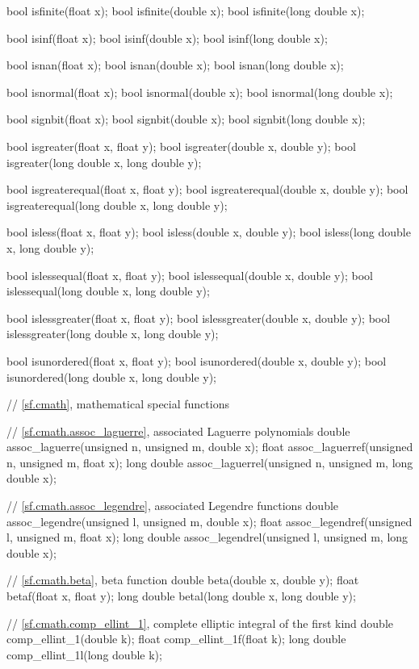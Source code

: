 \begin{codeblock}
{  bool isfinite(float x);
  bool isfinite(double x);
  bool isfinite(long double x);

  bool isinf(float x);
  bool isinf(double x);
  bool isinf(long double x);

  bool isnan(float x);
  bool isnan(double x);
  bool isnan(long double x);

  bool isnormal(float x);
  bool isnormal(double x);
  bool isnormal(long double x);

  bool signbit(float x);
  bool signbit(double x);
  bool signbit(long double x);

  bool isgreater(float x, float y);
  bool isgreater(double x, double y);
  bool isgreater(long double x, long double y);

  bool isgreaterequal(float x, float y);
  bool isgreaterequal(double x, double y);
  bool isgreaterequal(long double x, long double y);

  bool isless(float x, float y);
  bool isless(double x, double y);
  bool isless(long double x, long double y);

  bool islessequal(float x, float y);
  bool islessequal(double x, double y);
  bool islessequal(long double x, long double y);

  bool islessgreater(float x, float y);
  bool islessgreater(double x, double y);
  bool islessgreater(long double x, long double y);

  bool isunordered(float x, float y);
  bool isunordered(double x, double y);
  bool isunordered(long double x, long double y);

  // \ref{sf.cmath}, mathematical special functions

  // \ref{sf.cmath.assoc_laguerre}, associated Laguerre polynomials
  double       assoc_laguerre(unsigned n, unsigned m, double x);
  float        assoc_laguerref(unsigned n, unsigned m, float x);
  long double  assoc_laguerrel(unsigned n, unsigned m, long double x);

  // \ref{sf.cmath.assoc_legendre}, associated Legendre functions
  double       assoc_legendre(unsigned l, unsigned m, double x);
  float        assoc_legendref(unsigned l, unsigned m, float x);
  long double  assoc_legendrel(unsigned l, unsigned m, long double x);

  // \ref{sf.cmath.beta}, beta function
  double       beta(double x, double y);
  float        betaf(float x, float y);
  long double  betal(long double x, long double y);

  // \ref{sf.cmath.comp_ellint_1}, complete elliptic integral of the first kind
  double       comp_ellint_1(double k);
  float        comp_ellint_1f(float k);
  long double  comp_ellint_1l(long double k);

}
\end{codeblock}
